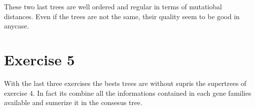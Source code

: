 \documentclass[]{article}
\theoremstyle{definition}
\begin{document}
These two last trees are well ordered and regular in terms of mutatiobal distances. Even if the trees are not the same, their quality seem to be good in anycase.

\section{Exercise 5}

With the last three exercises the bests trees are without supris the supertrees of exercise 4. In fact its combine all the informations contained in each gene families available and sumerize it in the consesus tree.
\end{document}
